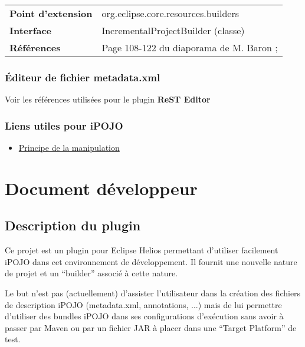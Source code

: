 \documentclass[letterpaper,10pt,french]{sphinxmanual}
\begin{document}
\begin{tabulary}{\linewidth}{|L|L|}
\hline

\textbf{Point d'extension}
 & 
org.eclipse.core.resources.builders
\\

\textbf{Interface}
 & 
IncrementalProjectBuilder (classe)
\\

\textbf{Références}
 & 
Page 108-122 du diaporama de M. Baron ;
\\
\hline
\end{tabulary}



\subsection{Éditeur de fichier metadata.xml}
\label{eclipse/index:editeur-de-fichier-metadata-xml}
Voir les références utilisées pour le plugin \textbf{ReST Editor}


\subsection{Liens utiles pour iPOJO}
\label{eclipse/index:liens-utiles-pour-ipojo}\begin{itemize}
\item {} 
\href{http://felix.apache.org/site/dive-into-the-ipojo-manipulation-depths.html}{Principe de la manipulation}

\end{itemize}


\chapter{Document développeur}
\label{developer/index::doc}\label{developer/index:document-developpeur}

\section{Description du plugin}
\label{developer/index:description-du-plugin}
Ce projet est un plugin pour Eclipse Helios permettant d'utiliser facilement
iPOJO dans cet environnement de développement.
Il fournit une nouvelle nature de projet et un ``builder'' associé à cette nature.

Le but n'est pas (actuellement) d'assister l'utilisateur dans la création des
fichiers de description iPOJO (metadata.xml, annotations, ...) mais de lui
permettre d'utiliser des bundles iPOJO dans ses configurations d'exécution sans
avoir à passer par Maven ou par un fichier JAR à placer dans une
``Target Platform'' de test.
\end{document}
